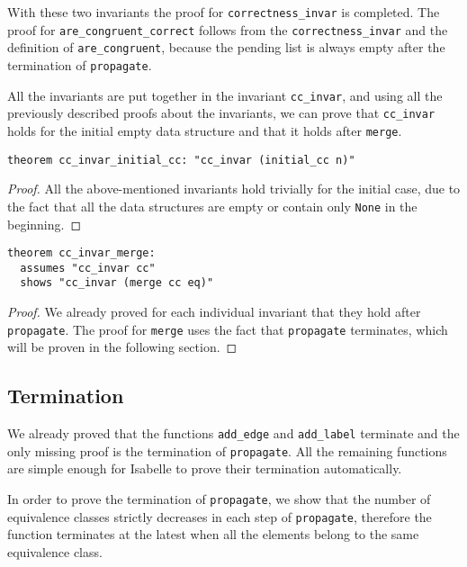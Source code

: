 With these two invariants the proof for \lstinline{correctness_invar} is completed.
The proof for \lstinline{are_congruent_correct} follows from the \lstinline{correctness_invar} and the definition of \lstinline|are_congruent|, because
the pending list is always empty after the termination of \lstinline|propagate|.

All the invariants are put together in the invariant \lstinline{cc_invar}, and using all the previously described proofs about the invariants, we can prove that \lstinline{cc_invar} holds for the initial empty data structure and that it holds after \lstinline{merge}.

\begin{lstlisting}
theorem cc_invar_initial_cc: "cc_invar (initial_cc n)"
\end{lstlisting}

\begin{proof}
All the above-mentioned invariants hold trivially for the initial case, due to the fact that all the data structures are empty or contain only \lstinline{None} in the beginning.
\end{proof}

\begin{lstlisting}
theorem cc_invar_merge:
  assumes "cc_invar cc"
  shows "cc_invar (merge cc eq)"
\end{lstlisting}

\begin{proof}
We already proved for each individual invariant that they hold after \lstinline|propagate|.
The proof for \lstinline|merge| uses the fact that \lstinline{propagate} terminates, which will be proven in the following section.
\end{proof}

\subsection{Termination}\label{section:termination-propagate}

We already proved that the functions \lstinline|add_edge| and \lstinline|add_label| terminate and the only missing proof is the termination of \lstinline|propagate|. All the remaining functions are simple enough for Isabelle to prove their termination automatically.

In order to prove the termination of \lstinline{propagate}, we show that the number of equivalence classes strictly decreases in each step of \lstinline{propagate}, therefore the function terminates at the latest when all the elements belong to the same equivalence class.

